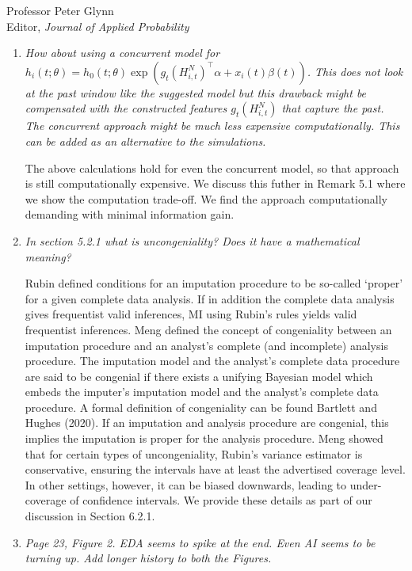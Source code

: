 \documentclass[11pt]{letter} %
\begin{document}
\begin{letter}{Professor
	Peter Glynn\\
	Editor, {\em Journal of Applied Probability}}
\begin{enumerate}
\vspace{5mm}

\item {\it How about using a concurrent model for $h_i (t;\theta) = h_0 (t; \theta) \exp (g_t (H_{i,t}^N)^\top \alpha + x_i (t) \beta (t))$. This does not look at the past window like the suggested model but this drawback might be compensated with the constructed features $g_t (H_{i,t}^N)$ that capture the past. The concurrent approach might be much less expensive computationally. This can be added as an alternative to the simulations.}

\vspace{5mm}
The above calculations hold for even the concurrent model, so that approach is still computationally expensive. We discuss this futher in Remark 5.1 where we show the computation trade-off.  We find the approach computationally demanding with minimal information gain.
\vspace{5mm}

\item {\it In section 5.2.1 what is uncongeniality? Does it have a mathematical
meaning?}

\vspace{5mm}
Rubin defined conditions for an imputation procedure to be so-called ‘proper’ for a given complete data analysis. If in addition the complete data analysis gives frequentist valid inferences, MI using Rubin’s rules yields valid frequentist inferences. Meng defined the concept of congeniality between an imputation procedure and an analyst’s complete (and incomplete) analysis procedure. The imputation model and the analyst’s complete data procedure are said to be congenial if there exists a unifying Bayesian model which embeds the imputer’s imputation model and the analyst’s complete data procedure.  A formal definition of congeniality can be found Bartlett and Hughes (2020).  If an imputation and analysis procedure are congenial, this implies the imputation is proper for the analysis procedure. Meng showed that for certain types of uncongeniality, Rubin’s variance estimator is conservative, ensuring the intervals have at least the advertised coverage level. In other settings, however, it can be biased downwards, leading to under-coverage of confidence intervals.  We provide these details as part of our discussion in Section 6.2.1.
\vspace{5mm}

\item {\it Page 23, Figure 2. EDA seems to spike at the end. Even AI seems to be turning up. Add longer history to both the Figures.}
\vspace{5mm}


\end{enumerate}
\end{letter}
\end{document}
